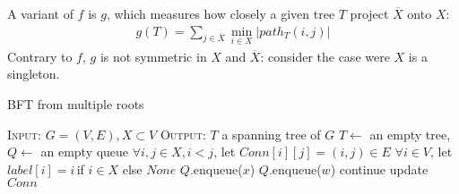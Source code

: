 \documentclass[a4paper,final,notitlepage,11pt,svgnames]{scrartcl}
\newcommand{\stcomp}[1]{\ensuremath{\overline{#1}}}
\begin{document}
A variant of $f$ is $g$, which measures how closely a given tree $T$ project
$\stcomp{X}$ onto $X$:
\begin{align}
	g(T)= \sum_{j \in \stcomp{X}} \min_{i \in X} \left| path_T(i, j) \right |
\end{align}
Contrary to $f$, $g$ is not symmetric in $X$ and $\stcomp{X}$: consider the
case were $X$ is a singleton.

\begin{algorithm}
	\caption{BFT from multiple roots \label{alg:mbfs}}
	\begin{algorithmic}[0]
		\State \textsc{Input:} $G=(V, E), X \subset V$
		\State \textsc{Output:} $T$ a spanning tree of $G$
		\State $T \gets$ an empty tree, $Q \gets$ an empty queue
		\State $\forall i,j \in X, i<j$, let $Conn[i][j] = (i, j) \in E$
		\State $\forall i \in V$, let $label[i] = i \,$if $i\in X$ else $None$
			\State $Q$.enqueue($x$)
		\EndFor
					\State $Q$.enqueue($w$)
					\State continue
				\Else {}
					\State update $Conn$
				\EndIf
			\EndFor
		\EndWhile
	\end{algorithmic}
\end{algorithm}

\end{document}
